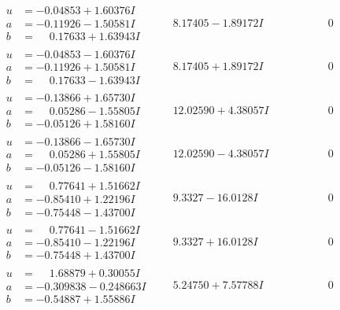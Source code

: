 \documentclass[1p]{elsarticle_modified}
\theoremstyle{definition}
\begin{document}
$$\begin{array}{c|c|c}
\begin{aligned}
u &= -0.04853 + 1.60376 I \\
a &= -0.11926 - 1.50581 I \\
b &= \phantom{-}0.17633 + 1.63943 I\end{aligned}
 & \phantom{-}8.17405 - 1.89172 I & \phantom{-0.000000 } 0 \\ \hline\begin{aligned}
u &= -0.04853 - 1.60376 I \\
a &= -0.11926 + 1.50581 I \\
b &= \phantom{-}0.17633 - 1.63943 I\end{aligned}
 & \phantom{-}8.17405 + 1.89172 I & \phantom{-0.000000 } 0 \\ \hline\begin{aligned}
u &= -0.13866 + 1.65730 I \\
a &= \phantom{-}0.05286 - 1.55805 I \\
b &= -0.05126 + 1.58160 I\end{aligned}
 & \phantom{-}12.02590 + 4.38057 I & \phantom{-0.000000 } 0 \\ \hline\begin{aligned}
u &= -0.13866 - 1.65730 I \\
a &= \phantom{-}0.05286 + 1.55805 I \\
b &= -0.05126 - 1.58160 I\end{aligned}
 & \phantom{-}12.02590 - 4.38057 I & \phantom{-0.000000 } 0 \\ \hline\begin{aligned}
u &= \phantom{-}0.77641 + 1.51662 I \\
a &= -0.85410 + 1.22196 I \\
b &= -0.75448 - 1.43700 I\end{aligned}
 & \phantom{-}9.3327 - 16.0128 I & \phantom{-0.000000 } 0 \\ \hline\begin{aligned}
u &= \phantom{-}0.77641 - 1.51662 I \\
a &= -0.85410 - 1.22196 I \\
b &= -0.75448 + 1.43700 I\end{aligned}
 & \phantom{-}9.3327 + 16.0128 I & \phantom{-0.000000 } 0 \\ \hline\begin{aligned}
u &= \phantom{-}1.68879 + 0.30055 I \\
a &= -0.309838 - 0.248663 I \\
b &= -0.54887 + 1.55886 I\end{aligned}
 & \phantom{-}5.24750 + 7.57788 I & \phantom{-0.000000 } 0 \\ \hline\begin{aligned}

\end{aligned}
\end{array}$$
\end{document}
